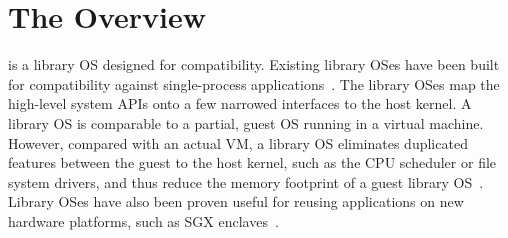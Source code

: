 \section{The \graphene{} Overview}
\label{sec:overview:libos}

\graphene{} is a library OS designed for compatibility.
Existing library OSes have been built for compatibility against single-process applications~\cite{porter11drawbridge}. The library OSes map the high-level system APIs onto a few narrowed interfaces to the host kernel. %
A library OS is comparable to a partial, guest OS running in a virtual machine.
However, compared with an actual VM, a library OS eliminates duplicated features between the guest to the host kernel, such as the CPU scheduler or file system drivers, and thus reduce the memory footprint of a guest library OS~\cite{porter11drawbridge,unikernels}.
Library OSes have also been proven useful for reusing applications on new hardware platforms, such as SGX enclaves~\cite{baumann14haven}.



